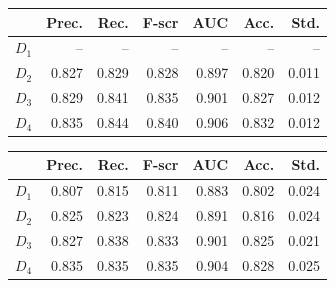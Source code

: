 \documentclass{article} %
\begin{document}
 \begin{figure}
  \begin{minipage}[b]{0.49\textwidth}
    \centering



\begin{tabularx}{\linewidth}{l r r r r r r}
		\toprule[.2em]
		 &{\bf Prec.}& {\bf Rec.}&{\bf F-scr}&{\bf AUC}&{\bf Acc.}&{\bf Std.}\\
		\midrule
		$D_1$&--& --&-- &--&--&--\\
		$D_2$&0.827&0.829&0.828&0.897&0.820&0.011\\
		$D_3$&0.829&0.841&0.835&0.901&0.827&0.012\\
		$D_4$&0.835& 0.844&0.840&0.906&0.832&0.012\\
		\bottomrule[.2em]
	\end{tabularx}
	 \label{tab:dnnperf}
    \end{minipage}
\hfill
  \begin{minipage}[b]{0.49\textwidth}
    \centering




\begin{tabularx}{\linewidth}{l r r r r r r}
		\toprule[.2em]
		 &{\bf Prec.}& {\bf Rec.}&{\bf F-scr}&{\bf AUC}&{\bf Acc.}&{\bf Std.}\\
		\midrule
		$D_1$&0.807& 0.815&0.811 &0.883&0.802&0.024\\
		$D_2$&0.825 &0.823&0.824 &0.891&0.816&0.024\\
		$D_3$&0.827& 0.838&0.833 &0.901&0.825&0.021\\
		$D_4$&0.835& 0.835&0.835 &0.904&0.828&0.025\\
		\bottomrule[.2em]
	\end{tabularx}
	 \label{tab:dnnperf}
  \end{minipage}
 
  \end{figure}
\end{document}
